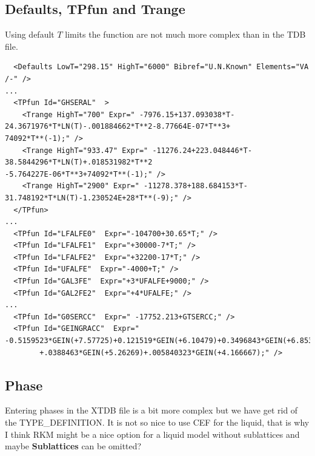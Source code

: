 \documentclass{article}
\begin{document}
\begin{appendices}
\subsection{Defaults, TPfun and Trange}\label{sec:tpfuns}

Using default $T$ limits the function are not much more complex than
in the TDB file.

{\small
\begin{verbatim}
  <Defaults LowT="298.15" HighT="6000" Bibref="U.N.Known" Elements="VA /-" />
...
  <TPfun Id="GHSERAL"  >
    <Trange HighT="700" Expr=" -7976.15+137.093038*T-24.3671976*T*LN(T)-.001884662*T**2-8.77664E-07*T**3+
74092*T**(-1);" />
    <Trange HighT="933.47" Expr=" -11276.24+223.048446*T-38.5844296*T*LN(T)+.018531982*T**2
-5.764227E-06*T**3+74092*T**(-1);" />
    <Trange HighT="2900" Expr=" -11278.378+188.684153*T-31.748192*T*LN(T)-1.230524E+28*T**(-9);" />
  </TPfun>
...
  <TPfun Id="LFALFE0"  Expr="-104700+30.65*T;" />
  <TPfun Id="LFALFE1"  Expr="+30000-7*T;" />
  <TPfun Id="LFALFE2"  Expr="+32200-17*T;" />
  <TPfun Id="UFALFE"  Expr="-4000+T;" />
  <TPfun Id="GAL3FE"  Expr="+3*UFALFE+9000;" />
  <TPfun Id="GAL2FE2"  Expr="+4*UFALFE;" />
...
  <TPfun Id="G0SERCC"  Expr=" -17752.213+GTSERCC;" /> 
  <TPfun Id="GEINGRACC"  Expr=" -0.5159523*GEIN(+7.57725)+0.121519*GEIN(+6.10479)+0.3496843*GEIN(+6.8533)
        +.0388463*GEIN(+5.26269)+.005840323*GEIN(+4.166667);" /> 
\end{verbatim}
}

\subsection{Phase}\label{sec:phaseexample}

Entering phases in the XTDB file is a bit more complex but we have get
rid of the TYPE\_DEFINITION.  It is not so nice to use CEF for the
liquid, that is why I think RKM might be a nice option for a liquid
model without sublattices and maybe {\bf Sublattices} can be omitted?


\end{appendices}
\end{document}
